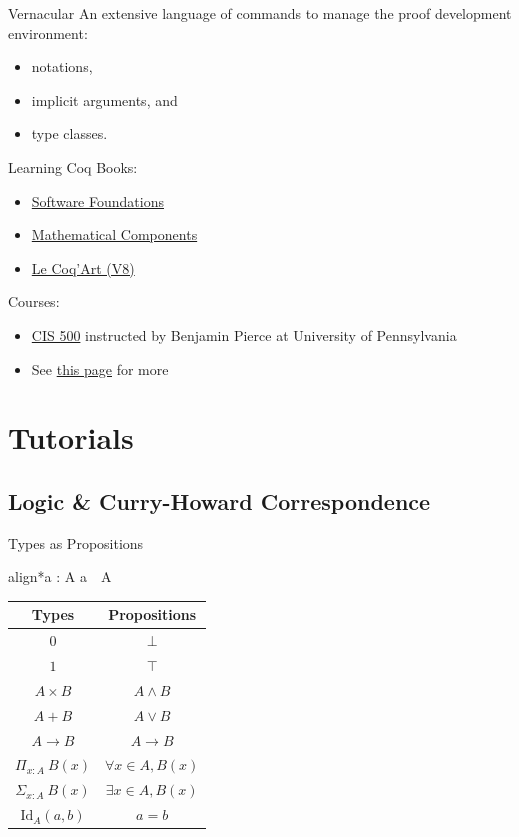 \documentclass[usenames,xcolor=svgnames,11pt,sans,aspectratio=169,handout]{beamer}
\newcommand{\boxedeq}[1]{\begin{empheq}[box=\fbox]{align*}#1\end{empheq}}
\begin{document}
\begin{frame}{Vernacular}
  An extensive language of commands to manage the proof development environment:
  \begin{itemize}
    \item notations,
    \item implicit arguments, and
    \item type classes.
  \end{itemize}
\end{frame}

\begin{frame}{Learning Coq}
  Books:
  \begin{itemize}
    \item \href{https://softwarefoundations.cis.upenn.edu}{Software Foundations}
    \item \href{https://math-comp.github.io/mcb/book.pdf}{Mathematical Components}
    \item \href{https://www.labri.fr/perso/casteran/CoqArt/coqartF.pdf}{Le Coq'Art (V8)}
  \end{itemize}

  Courses:
  \begin{itemize}
    \item \href{https://www.seas.upenn.edu/~cis500/current/index.html}{CIS 500} instructed by Benjamin Pierce at University of Pennsylvania
    \item See \href{https://github.com/coq/coq/wiki/CoqInTheClassroom}{this page} for more
  \end{itemize}
\end{frame}

\section{Tutorials}

\subsection{Logic \& Curry-Howard Correspondence}

\begin{frame}{Types as Propositions}
  \boxedeq{a : A \iff a~~A}

  \begin{center}
    \begin{tabular}{cc}
      Types & Propositions \\
      \hline
      $0$ & $\bot$ \\
      $1$ & $\top$ \\
      $A \times B$ & $A \land B$ \\
      $A + B$ & $A \lor B$ \\
      $A \to B$ & $A \to B$ \\
      $\Pi_{x: A}~B(x)$ & $\forall x \in A, B(x)$ \\
      $\Sigma_{x: A}~B(x)$ & $\exists x \in A, B(x)$ \\
      $\text{Id}_A(a, b)$ & $a = b$
    \end{tabular}
  \end{center}
\end{frame}
\end{document}
